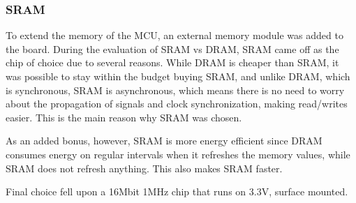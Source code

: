
\subsubsection{SRAM}

To extend the memory of the MCU, an external memory module was added to the
board. During the evaluation of SRAM vs DRAM, SRAM came off as the chip of
choice due to several reasons. While DRAM is cheaper than SRAM, it was possible
to stay within the budget buying SRAM,
and unlike DRAM, which is synchronous, SRAM is asynchronous, which means there
is no need to worry about the propagation of signals and clock synchronization,
making read/writes easier. This is the main reason why SRAM was chosen.

As an added bonus, however, SRAM is more energy efficient since DRAM consumes
energy on regular intervals when it refreshes the memory values, while SRAM does
not refresh anything. This also makes SRAM faster.

Final choice fell upon a 16Mbit 1MHz chip that runs on 3.3V, surface mounted.

